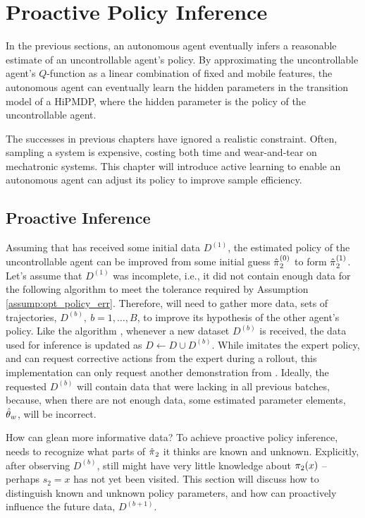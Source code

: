 \chapter{Proactive Policy Inference}\label{chapt:proactive_inference}

In the previous sections, an autonomous agent eventually infers a reasonable estimate of an
uncontrollable agent's policy. By approximating the uncontrollable agent's $Q$-function as a linear combination of fixed
and mobile features, the autonomous agent can eventually learn the hidden parameters in the transition model of a
\ac{HiPMDP}, where the hidden parameter is the policy of the uncontrollable agent.

The successes in previous chapters have ignored a realistic constraint. Often, sampling a system is expensive, costing
both time and wear-and-tear on mechatronic systems. This chapter will introduce active learning to enable an autonomous
agent can adjust its policy to improve sample efficiency.

\section{Proactive Inference}

Assuming that  has received some initial data $D^{(1)}$, the estimated policy of the uncontrollable agent can
be improved from some initial guess $\hat{\pi_{}}_2^{(0)}$ to form $\hat{\pi_{}}_2^{(1)}$. Let's assume
that $D^{(1)}$ was incomplete, i.e., it did not contain enough data for the following algorithm to meet the tolerance
required by Assumption \ref{assump:opt_policy_err}. Therefore,  will need to gather more data, sets of
trajectories, $D^{(b)},\ b=1,\ldots,B$, to improve its hypothesis of the other agent's policy. Like the \DAGGER
algorithm \cite{ross2011reduction}, whenever a new dataset $D^{(b)}$ is received, the data used for inference is updated
as $D\leftarrow D\cup D^{(b)}$. While \DAGGER imitates the expert policy, and can request corrective actions from the
expert during a rollout, this implementation can only request another demonstration from .  Ideally, the
requested $D^{(b)}$ will contain data that were lacking in all previous batches, because, when there are not enough
data, some estimated parameter elements, $\hat{\theta}_{w}$, will be incorrect.

How can  glean more informative data? To achieve proactive policy inference,  needs to recognize what
parts of $\hat{\pi_{}}_2$ it thinks are known and unknown. Explicitly, after observing $D^{(b)}$, 
still might have very little knowledge about $\pi_{2}(x)$ -- perhaps $s_2=x$ has not yet been visited. This section
will discuss how to distinguish known and unknown policy parameters, and how  can proactively influence the
future data, $D^{(b+1)}$.


